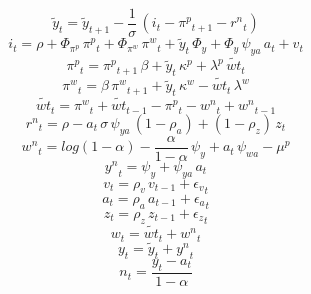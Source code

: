 \begin{dmath}
{{\tilde{y}}_{t}}={{\tilde{y}}_{t+1}}-\frac{1}{{{\sigma}}}\, \left({{i}_{t}}-{{\pi^p}_{t+1}}-{{r^n}_{t}}\right)
\end{dmath}
\begin{dmath}
{{i}_{t}}={{\rho}}+{{\Phi_{\pi^p}}}\, {{\pi^p}_{t}}+{{\Phi_{\pi^w}}}\, {{\pi^w}_{t}}+{{\tilde{y}}_{t}}\, {{\Phi_{y}}}+{{\Phi_{y}}}\, {{\psi_{ya}}}\, {{a}_{t}}+{{v}_{t}}
\end{dmath}
\begin{dmath}
{{\pi^p}_{t}}={{\pi^p}_{t+1}}\, {{\beta}}+{{\tilde{y}}_{t}}\, {{\kappa^p}}+{{\lambda^p}}\, {{\tilde{wt}}_{t}}
\end{dmath}
\begin{dmath}
{{\pi^w}_{t}}={{\beta}}\, {{\pi^w}_{t+1}}+{{\tilde{y}}_{t}}\, {{\kappa^w}}-{{\tilde{wt}}_{t}}\, {{\lambda^w}}
\end{dmath}
\begin{dmath}
{{\tilde{wt}}_{t}}={{\pi^w}_{t}}+{{\tilde{wt}}_{t-1}}-{{\pi^p}_{t}}-{{w^n}_{t}}+{{w^n}_{t-1}}
\end{dmath}
\begin{dmath}
{{r^n}_{t}}={{\rho}}-{{a}_{t}}\, {{\sigma}}\, {{\psi_{ya}}}\, \left(1-{{\rho_a}}\right)+\left(1-{{\rho_z}}\right)\, {{z}_{t}}
\end{dmath}
\begin{dmath}
{{w^n}_{t}}=log\left(1-{{\alpha}}\right)-\frac{{{\alpha}}}{1-{{\alpha}}}\, {{\psi_{y}}}+{{a}_{t}}\, {{\psi_{wa}}}-{{\mu^p}}
\end{dmath}
\begin{dmath}
{{y^n}_{t}}={{\psi_{y}}}+{{\psi_{ya}}}\, {{a}_{t}}
\end{dmath}
\begin{dmath}
{{v}_{t}}={{\rho_v}}\, {{v}_{t-1}}+{{\epsilon_v}_{t}}
\end{dmath}
\begin{dmath}
{{a}_{t}}={{\rho_a}}\, {{a}_{t-1}}+{{\epsilon_a}_{t}}
\end{dmath}
\begin{dmath}
{{z}_{t}}={{\rho_z}}\, {{z}_{t-1}}+{{\epsilon_z}_{t}}
\end{dmath}
\begin{dmath}
{{w}_{t}}={{\tilde{wt}}_{t}}+{{w^n}_{t}}
\end{dmath}
\begin{dmath}
{{y}_{t}}={{\tilde{y}}_{t}}+{{y^n}_{t}}
\end{dmath}
\begin{dmath}
{{n}_{t}}=\frac{{{y}_{t}}-{{a}_{t}}}{1-{{\alpha}}}
\end{dmath}

